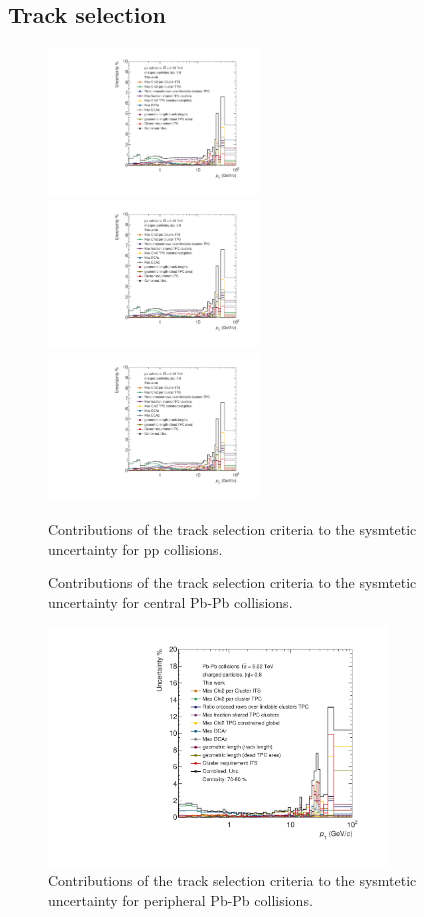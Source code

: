 \documentclass[12pt,a4paper]{report}
\begin{document}
\subsection{Track selection} 
\begin{figure}[H]
\centering
\includegraphics[width=0.495\textwidth]{Plots/SysUncpp.pdf}  
\includegraphics[width=0.495\textwidth]{Plots/SysUncpp.pdf}  
\includegraphics[width=0.495\textwidth]{Plots/SysUncpp.pdf}  

\caption{Contributions of the track selection criteria to the sysmtetic uncertainty for pp collisions.}
\label{SysUncpp}
\end{figure}
\begin{figure}[H]
\centering
\caption{Contributions of the track selection criteria to the sysmtetic uncertainty for central Pb-Pb collisions.}
\label{SysUncpp}
\end{figure}
\begin{figure}[H]
\centering
\includegraphics[width=9cm]{Plots/SysUncPbPbperi.pdf}  
\caption{Contributions of the track selection criteria to the sysmtetic uncertainty for peripheral Pb-Pb collisions.}
\label{SysUncpp}
\end{figure}
\end{document}
